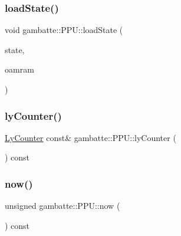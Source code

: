 \subsubsection{\texorpdfstring{load\+State()}{loadState()}}
{\footnotesize\ttfamily void gambatte\+::\+P\+P\+U\+::load\+State (\begin{DoxyParamCaption}\item[{\hyperlink{structgambatte_1_1SaveState}{Save\+State} const \&}]{state,  }\item[{unsigned char const $\ast$}]{oamram }\end{DoxyParamCaption})}

\mbox{\label{classgambatte_1_1PPU_ae6bb249f7d93eb7ef39b44f9f398d194}} 
\subsubsection{\texorpdfstring{ly\+Counter()}{lyCounter()}}
{\footnotesize\ttfamily \hyperlink{classgambatte_1_1LyCounter}{Ly\+Counter} const\& gambatte\+::\+P\+P\+U\+::ly\+Counter (\begin{DoxyParamCaption}{ }\end{DoxyParamCaption}) const\hspace{0.3cm}{\ttfamily [inline]}}

\mbox{\label{classgambatte_1_1PPU_aeeea3c335760b8f386059c144508e011}} 
\subsubsection{\texorpdfstring{now()}{now()}}
{\footnotesize\ttfamily unsigned gambatte\+::\+P\+P\+U\+::now (\begin{DoxyParamCaption}{ }\end{DoxyParamCaption}) const\hspace{0.3cm}{\ttfamily [inline]}}

\mbox{\label{classgambatte_1_1PPU_ace3683a992aace437ce28239f43e7ab4}} 
